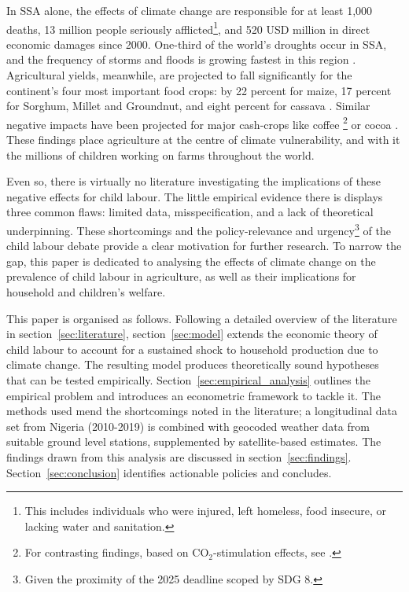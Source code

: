 \documentclass[a4paper,12pt]{article}
\theoremstyle{plain}
\theoremstyle{definition}
\theoremstyle{definition}
\theoremstyle{definition}
\theoremstyle{definition}
\begin{document}
In SSA alone, the effects of climate change are responsible for at least 1,000 deaths, 13 million people seriously afflicted\footnote{This includes individuals who were injured, left homeless, food insecure, or lacking water and sanitation.}, and 520 USD million in direct economic damages since 2000. One-third of the world’s droughts occur in SSA, and the frequency of storms and floods is growing fastest in this region \citep{IMF2020}. Agricultural yields, meanwhile, are projected to fall significantly for the continent's four most important food crops: by 22 percent for maize, 17 percent for Sorghum, Millet and Groundnut, and eight percent for cassava \citep{Schlenker2010}. Similar negative impacts have been projected for major cash-crops like coffee \citep{Craparo2015}\footnote{For contrasting findings, based on CO$_2$-stimulation effects, see \citep{DaMatta2019}.} or cocoa \citep{Boeckx2020}. These findings place agriculture at the centre of climate vulnerability, and with it the millions of children working on farms throughout the world.

Even so, there is virtually no literature investigating the implications of these negative effects for child labour. The little empirical evidence there is displays three common flaws: limited data, misspecification, and a lack of theoretical underpinning. These shortcomings and the policy-relevance and urgency\footnote{Given the proximity of the 2025 deadline scoped by SDG 8.} of the child labour debate provide a clear motivation for further research. To narrow the gap, this paper is dedicated to analysing the effects of climate change on the prevalence of child labour in agriculture, as well as their implications for household and children’s welfare.

This paper is organised as follows. Following a detailed overview of the literature in section~\ref{sec:literature}, section~\ref{sec:model} extends the economic theory of child labour to account for a sustained shock to household production due to climate change. The resulting model produces theoretically sound hypotheses that can be tested empirically. Section~\ref{sec:empirical_analysis} outlines the empirical problem and introduces an econometric framework to tackle it. The methods used mend the shortcomings noted in the literature; a longitudinal data set from Nigeria (2010-2019) is combined with geocoded weather data from suitable ground level stations, supplemented by satellite-based estimates. The findings drawn from this analysis are discussed in section~\ref{sec:findings}. %
Section~\ref{sec:conclusion} identifies actionable policies and concludes.
\end{document}
